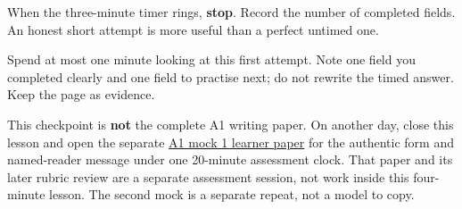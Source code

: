 When the three-minute timer rings, \textbf{stop}. Record the number of completed fields. An honest short attempt is more useful than a perfect untimed one.

\begin{tcolorbox}[breakable,colback=teal!4,colframe=teal!35!black,title={Before you move on}]
Spend at most one minute looking at this first attempt. Note one field you completed clearly and one field to practise next; do not rewrite the timed answer. Keep the page as evidence.

This checkpoint is \textbf{not} the complete A1 writing paper. On another day, close this lesson and open the separate \href{https://github.com/adhithyan15/coding-adventures/blob/main/code/learning/human-languages/sanskrit/mocks/a1/mock-1.md}{A1 mock 1 learner paper} for the authentic form and named-reader message under one 20-minute assessment clock. That paper and its later rubric review are a separate assessment session, not work inside this four-minute lesson. The second mock is a separate repeat, not a model to copy.
\end{tcolorbox}
